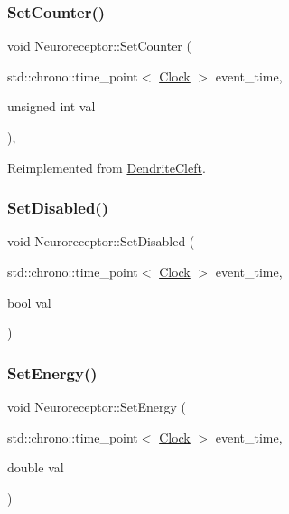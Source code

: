 \mbox{\label{classNeuroreceptor_a0660a316ef44cf723509f720acd16f24}} 
\subsubsection{\texorpdfstring{Set\+Counter()}{SetCounter()}}
{\footnotesize\ttfamily void Neuroreceptor\+::\+Set\+Counter (\begin{DoxyParamCaption}\item[{std\+::chrono\+::time\+\_\+point$<$ \mbox{\hyperlink{universe_8h_a0ef8d951d1ca5ab3cfaf7ab4c7a6fd80}{Clock}} $>$}]{event\+\_\+time,  }\item[{unsigned int}]{val }\end{DoxyParamCaption})\hspace{0.3cm}{\ttfamily [inline]}, {\ttfamily [virtual]}}



Reimplemented from \mbox{\hyperlink{classDendriteCleft_a428b8e5117f381a382e0071b936d42a1}{Dendrite\+Cleft}}.

\mbox{\label{classNeuroreceptor_aeec8bb2442e04700d4e9d80bb2d6e47e}} 
\subsubsection{\texorpdfstring{Set\+Disabled()}{SetDisabled()}}
{\footnotesize\ttfamily void Neuroreceptor\+::\+Set\+Disabled (\begin{DoxyParamCaption}\item[{std\+::chrono\+::time\+\_\+point$<$ \mbox{\hyperlink{universe_8h_a0ef8d951d1ca5ab3cfaf7ab4c7a6fd80}{Clock}} $>$}]{event\+\_\+time,  }\item[{bool}]{val }\end{DoxyParamCaption})\hspace{0.3cm}{\ttfamily [inline]}}

\mbox{\label{classNeuroreceptor_ac1189f9c40e3cd07e4b1dc11115ad882}} 
\subsubsection{\texorpdfstring{Set\+Energy()}{SetEnergy()}}
{\footnotesize\ttfamily void Neuroreceptor\+::\+Set\+Energy (\begin{DoxyParamCaption}\item[{std\+::chrono\+::time\+\_\+point$<$ \mbox{\hyperlink{universe_8h_a0ef8d951d1ca5ab3cfaf7ab4c7a6fd80}{Clock}} $>$}]{event\+\_\+time,  }\item[{double}]{val }\end{DoxyParamCaption})\hspace{0.3cm}{\ttfamily [inline]}}

